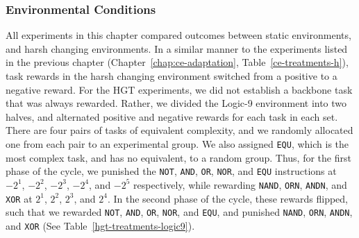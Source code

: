 \documentclass[letterpaper]{article}
\begin{document}
\subsubsection{Environmental Conditions}
All experiments in this chapter compared outcomes between static environments, and harsh changing environments. In a similar manner to the experiments listed in the previous chapter (Chapter~\ref{chap:ce-adaptation}, Table~\ref{ce-treatments-h}), task rewards in the harsh changing environment switched from a positive to a negative reward. For the HGT experiments, we did not establish a backbone task that was always rewarded. Rather, we divided the Logic-9 environment into two halves, and alternated positive and negative rewards for each task in each set. There are four pairs of tasks of equivalent complexity, and we randomly allocated one from each pair to an experimental group. We also assigned \texttt{EQU}, which is the most complex task, and has no equivalent, to a random group. Thus, for the first phase of the cycle, we punished the \texttt{NOT}, \texttt{AND}, \texttt{OR}, \texttt{NOR}, and \texttt{EQU} instructions at $-2^1$, $-2^2$, $-2^3$, $-2^4$, and $-2^5$ respectively, while rewarding \texttt{NAND}, \texttt{ORN}, \texttt{ANDN}, and \texttt{XOR} at $2^1$, $2^2$, $2^3$, and $2^4$. In the second phase of the cycle, these rewards flipped, such that we rewarded \texttt{NOT}, \texttt{AND}, \texttt{OR}, \texttt{NOR}, and \texttt{EQU}, and punished \texttt{NAND}, \texttt{ORN}, \texttt{ANDN}, and \texttt{XOR} (See Table~\ref{hgt-treatments-logic9}).
\end{document}
